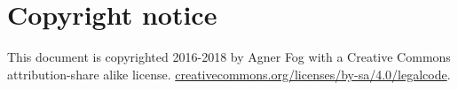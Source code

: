 \documentclass[forwardcom.tex]{subfiles}
\begin{document}
\RaggedRight

\chapter{Copyright notice}
This document is copyrighted 2016-2018 by Agner Fog with a Creative Commons attribution-share alike license.
\href{http://creativecommons.org/licenses/by-sa/4.0/legalcode}{creativecommons.org/licenses/by-sa/4.0/legalcode}.
\end{document}
